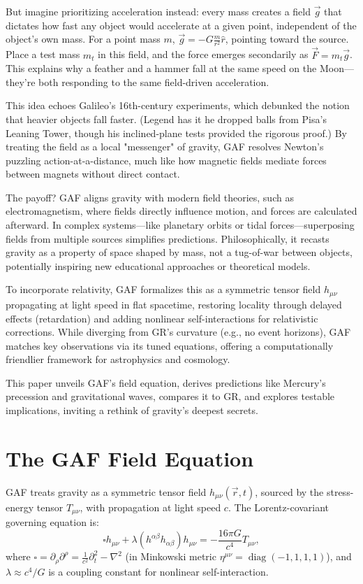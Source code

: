 \documentclass{article}
\begin{document}
But imagine prioritizing acceleration instead: every mass creates a field $ \vec{g} $ that dictates how fast any object would accelerate at a given point, independent of the object's own mass. For a point mass $ m $, $ \vec{g} = -G \frac{m}{r^2} \hat{r} $, pointing toward the source. Place a test mass $ m_t $ in this field, and the force emerges secondarily as $ \vec{F} = m_t \vec{g} $. This explains why a feather and a hammer fall at the same speed on the Moon—they're both responding to the same field-driven acceleration.

This idea echoes Galileo's 16th-century experiments, which debunked the notion that heavier objects fall faster. (Legend has it he dropped balls from Pisa's Leaning Tower, though his inclined-plane tests provided the rigorous proof.) By treating the field as a local "messenger" of gravity, GAF resolves Newton's puzzling action-at-a-distance, much like how magnetic fields mediate forces between magnets without direct contact.

The payoff? GAF aligns gravity with modern field theories, such as electromagnetism, where fields directly influence motion, and forces are calculated afterward. In complex systems—like planetary orbits or tidal forces—superposing fields from multiple sources simplifies predictions. Philosophically, it recasts gravity as a property of space shaped by mass, not a tug-of-war between objects, potentially inspiring new educational approaches or theoretical models.

To incorporate relativity, GAF formalizes this as a symmetric tensor field $ h_{\mu\nu} $ propagating at light speed in flat spacetime, restoring locality through delayed effects (retardation) and adding nonlinear self-interactions for relativistic corrections. While diverging from GR's curvature (e.g., no event horizons), GAF matches key observations via its tuned equations, offering a computationally friendlier framework for astrophysics and cosmology.

This paper unveils GAF's field equation, derives predictions like Mercury's precession and gravitational waves, compares it to GR, and explores testable implications, inviting a rethink of gravity's deepest secrets.

\section{The GAF Field Equation}

GAF treats gravity as a symmetric tensor field \( h_{\mu\nu}(\vec{r}, t) \), sourced by the stress-energy tensor \( T_{\mu\nu} \), with propagation at light speed \( c \). The Lorentz-covariant governing equation is:
\begin{equation}
\square h_{\mu\nu} + \lambda (h^{\alpha\beta} h_{\alpha\beta}) h_{\mu\nu} = -\frac{16\pi G}{c^4} T_{\mu\nu},
\end{equation}
where \( \square = \partial_\rho \partial^\rho = \frac{1}{c^2} \partial_t^2 - \nabla^2 \) (in Minkowski metric \( \eta^{\mu\nu} = \operatorname{diag}(-1,1,1,1) \)), and \( \lambda \approx c^4 / G \) is a coupling constant for nonlinear self-interaction.
\end{document}
